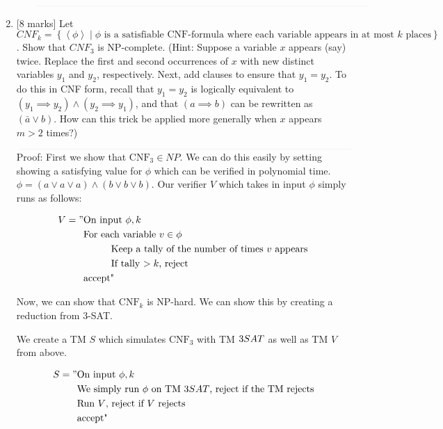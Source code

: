 \documentclass{article}
\newcommand{\class}[1]{\text{#1}}
\newcommand{\set}[1]{{\left\{#1\right\}}}    %
\newcommand{\enc}[1]{\left<#1\right>}
\newcommand\tab[1][1cm]{\hspace*{#1}}
\begin{document}
\begin{enumerate}
\begin{enumerate}
            $\textcolor[RGB]{220,220,220}{\rule{\linewidth}{0.2pt}}$


    \end{enumerate}
    \item {[8 marks]} Let $CNF_k=\set{\enc{\phi}\mid\phi\text{ is a satisfiable CNF-formula where each variable appears in at most }k\text{ places}}$. Show that ${CNF}_3$ is NP-complete. (Hint: Suppose a variable $x$ appears (say) twice. Replace the first and second occurrences of $x$ with new distinct variables $y_1$ and $y_2$, respectively. Next, add clauses to ensure that $y_1=y_2$. To do this in CNF form, recall that $y_1=y_2$ is logically equivalent to $(y_1\implies y_2)\wedge(y_2\implies y_1)$, and that $(a\implies b)$ can be rewritten as $(\bar{a}\vee {b})$. How can this trick be applied more generally when $x$ appears $m>2$ times?)


            $\textcolor[RGB]{220,220,220}{\rule{\linewidth}{0.2pt}}$
            Proof: First we show that $\class{CNF}_3 \in NP$. We can do this easily by setting showing a satisfying value for $\phi$ which can be verified in polynomial time.
            $\phi = (a \vee a \vee a) \wedge (b \vee b \vee b)$. Our verifier $V$ which takes in input $\phi$ simply runs as follows:

            \begin{equation}
            	\begin{split}
            		V = "& \text{On input $\phi,k$} \\
            			 & \text{For each variable $v \in \phi$} \\
            			 & \tab\text{Keep a tally of the number of times $v$ appears} \\
            			 & \tab\text{If tally $> k$, reject} \\
                         & \text{accept"}
            	\end{split}
            \end{equation}

            Now, we can show that $\class{CNF}_k$ is NP-hard. We can show this by creating a reduction from 3-SAT.

            We create a TM $S$ which simulates $\class{CNF}_3$ with TM $3\-SAT$ as well as TM $V$ from above.

            \begin{equation}
            	\begin{split}
            		S = "& \text{On input $\phi,k$} \\
            			 & \text{We simply run $\phi$ on TM $3SAT$, reject if the TM rejects} \\
            			 & \text{Run $V$, reject if $V$ rejects} \\
                         & \text{accept"}
            	\end{split}
            \end{equation}


\end{enumerate}
\end{document}
